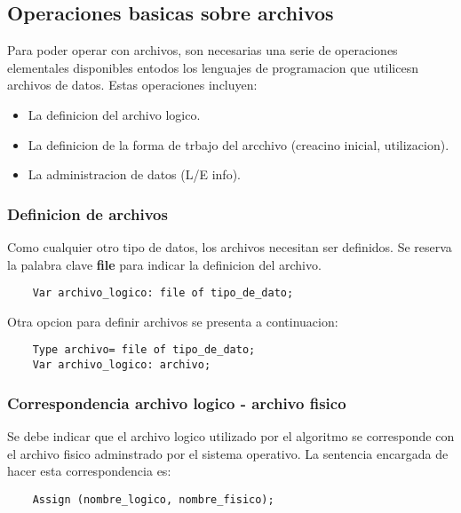 \subsection{Operaciones basicas sobre archivos}
Para poder operar con archivos, son necesarias una serie de operaciones elementales disponibles entodos los lenguajes de programacion que utilicesn archivos de datos. Estas operaciones incluyen:
\begin{itemize}
    \item La definicion del archivo logico.
    \item La definicion de la forma de trbajo del arcchivo (creacino inicial, utilizacion).
    \item La administracion de datos (L/E info).
\end{itemize}

\subsubsection{Definicion de archivos}
Como cualquier otro tipo de datos, los archivos necesitan ser definidos. Se reserva la palabra clave \textbf{file} para indicar la definicion del archivo.

\begin{lstlisting}
    Var archivo_logico: file of tipo_de_dato;
\end{lstlisting}

Otra opcion para definir archivos se presenta a continuacion:
\begin{lstlisting}
    Type archivo= file of tipo_de_dato;
    Var archivo_logico: archivo;
\end{lstlisting}

\subsubsection{Correspondencia archivo logico - archivo fisico}
Se debe indicar que el archivo logico utilizado por el algoritmo se corresponde con el archivo fisico adminstrado por el sistema operativo. La sentencia encargada de hacer esta correspondencia es:
\begin{lstlisting}
    Assign (nombre_logico, nombre_fisico);
\end{lstlisting}

